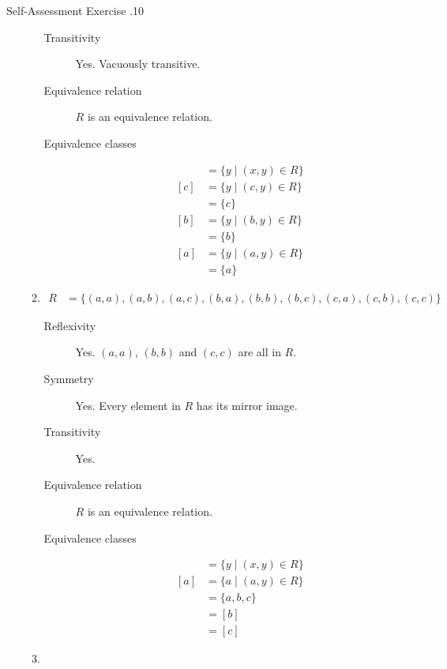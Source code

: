 \documentclass[../notes.tex]{subfiles}
\begin{document}
\begin{exercise}{Self-Assessment Exercise \thechapter.10}
\begin{enumerate}
\begin{enumerate}[label=(\alph*)]
\begin{description}
										\item[Transitivity] Yes. Vacuously transitive.
										\item[Equivalence relation] $R$ is an equivalence relation.
										\item[Equivalence classes] \moveup
											\begin{align*}
												[x] &= \{y \mid (x, y) \in R\}\\
												[c] &= \{y \mid (c, y) \in R\}\\
												&= \{c\}\\
												[b] &= \{y \mid (b, y) \in R\}\\
												&= \{b\}\\
												[a] &= \{y \mid (a, y) \in R\}\\
												&= \{a\}
											\end{align*}    
									\end{description}
								\pagebreak
								\item {}
									\begin{align*}
										R &= \bigl\{(a, a), (a, b), (a, c), (b, a), (b, b), (b, c), (c, a), (c, b), (c, c)\bigr\}
									\end{align*}
									\begin{description}
										\item[Reflexivity] Yes. $(a, a)$, $(b, b)$ and $(c, c)$ are all in $R$.
										\item[Symmetry] Yes. Every element in $R$ has its mirror image.
										\item[Transitivity] Yes.
										\item[Equivalence relation] $R$ is an equivalence relation.
										\item[Equivalence classes] \moveup
											\begin{align*}
												[x] &= \{y \mid (x, y) \in R\}\\
												[a] &= \{a \mid (a, y) \in R\}\\
												&= \{a, b, c\}\\
												&= [b]\\
												&= [c]
											\end{align*}   
									\end{description}
								\item {} \moveup

\end{enumerate}
\end{enumerate}
\end{exercise}
\end{document}
